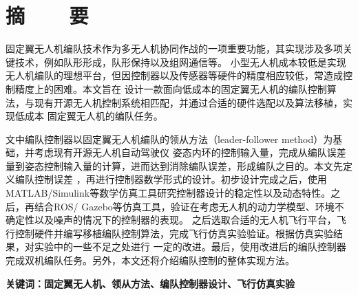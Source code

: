 \topskip=0pt

\vspace*{-7mm}

\begin{center}
  \heiti{}\textbf{\thesisTitle}
\end{center}

\vspace*{2mm}

{\let\clearpage\relax \chapter*{\textmd{摘~~~~要}}}
\setcounter{page}{1}

\vspace*{1mm}

\setlength{\parskip}{0em}

固定翼无人机编队技术作为多无人机协同作战的一项重要功能，其实现涉及多项关键技术，例如队形形成，队形保持以及组网通信等。
小型无人机成本较低是实现无人机编队的理想平台，但因控制器以及传感器等硬件的精度相应较低，常造成控制精度上的困难。本文旨在
设计一款面向低成本的固定翼无人机的编队控制算法，与现有开源无人机控制系统相匹配，并通过合适的硬件选配以及算法移植，实现低成本
固定翼无人机的编队任务。

文中编队控制器以固定翼无人机编队的领从方法（leader-follower method）为基础，并考虑现有开源无人机自动驾驶仪
姿态内环的控制输入量，完成从编队误差量到姿态控制输入量的计算，进而达到消除编队误差，形成编队之目的。本文先定义编队控制误差
，再进行控制器数学形式的设计。初步设计完成之后，使用MATLAB/Simulink等数学仿真工具研究控制器设计的稳定性以及动态特性。之后，再结合ROS/
Gazebo等仿真工具，验证在考虑无人机的动力学模型、环境不确定性以及噪声的情况下的控制器的表现。
之后选取合适的无人机飞行平台，飞行控制硬件并编写移植编队控制算法，完成飞行仿真实验验证。根据仿真实验结果，对实验中的一些不足之处进行
一定的改进。最后，使用改进后的编队控制器完成双机编队任务。另外，本文还将介绍编队控制的整体实现方法。

\vspace{4ex}\noindent\textbf{\heiti 关键词：固定翼无人机、领从方法、编队控制器设计、飞行仿真实验}
\newpage

\topskip=0pt

\vspace*{2mm}

\begin{spacing}{0.95}
  \centering
  \heiti{}\textbf{\thesisTitleEN}
\end{spacing}

